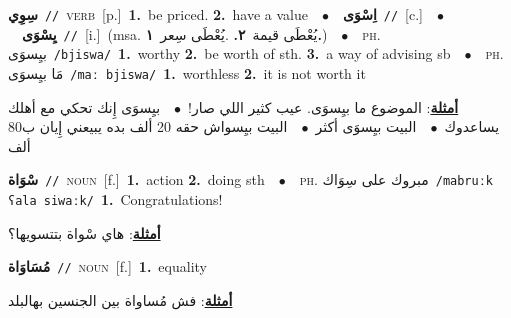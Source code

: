 \documentclass[10pt,a4paper,twoside]{article} %
\begin{document}
\begin{multicols}{2}
{\setlength\topsep{0pt}\textbf{\foreignlanguage{arabic}{سِوِي}}\ {\color{gray}\texttt{//}\color{black}}\ \textsc{verb}\ [p.]\ \textbf{1.}~be priced.  \textbf{2.}~have a value\ \ $\bullet$\ \ \setlength\topsep{0pt}\textbf{\foreignlanguage{arabic}{اِسْوَى}}\ {\color{gray}\texttt{//}\color{black}}\ [c.]\ \ $\bullet$\ \ \setlength\topsep{0pt}\textbf{\foreignlanguage{arabic}{يِسْوَى}}\ {\color{gray}\texttt{//}\color{black}}\ [i.]\ \color{gray}(msa. \foreignlanguage{arabic}{يُعْطَى قيمة}~\foreignlanguage{arabic}{\textbf{٢.}}  .\foreignlanguage{arabic}{يُعْطَى سِعر}~\foreignlanguage{arabic}{\textbf{١.}})\color{black}\ \ $\bullet$\ \ \textsc{ph.} \color{gray} \foreignlanguage{arabic}{بيِسوَى}\color{black}\ {\color{gray}\texttt{/{\sffamily bjiswa}/}\color{black}}\ \textbf{1.}~worthy  \textbf{2.}~be worth of sth.  \textbf{3.}~a way of advising sb\ \ $\bullet$\ \ \textsc{ph.} \color{gray} \foreignlanguage{arabic}{مَا بيِسوَى}\color{black}\ {\color{gray}\texttt{/{\sffamily maː bjiswa}/}\color{black}}\ \textbf{1.}~worthless  \textbf{2.}~it is not worth it\  \begin{flushright}\color{gray}\foreignlanguage{arabic}{\textbf{\underline{\foreignlanguage{arabic}{أمثلة}}}: الموضوع ما بيِسوَى. عيب كثير اللي صار!\ $\bullet$\ \  بيِسوَى إِنك تحكي مع أهلك يساعدوك\ $\bullet$\ \  البيت بيِسوَى أكثر\ $\bullet$\ \  البيت بيِسواش حقه 20 ألف بده يبيعني إِيان ب80 ألف}\end{flushright}\color{black}} \vspace{2mm}

{\setlength\topsep{0pt}\textbf{\foreignlanguage{arabic}{سْوَاة}}\ {\color{gray}\texttt{//}\color{black}}\ \textsc{noun}\ [f.]\ \textbf{1.}~action  \textbf{2.}~doing sth\ \ $\bullet$\ \ \textsc{ph.} \color{gray} \foreignlanguage{arabic}{مبروك على سِوَاك}\color{black}\ {\color{gray}\texttt{/{\sffamily mabruːk ʕala siwaːk}/}\color{black}}\ \textbf{1.}~Congratulations!\  \begin{flushright}\color{gray}\foreignlanguage{arabic}{\textbf{\underline{\foreignlanguage{arabic}{أمثلة}}}: هاي سْواة بتتسويها؟}\end{flushright}\color{black}} \vspace{2mm}

{\setlength\topsep{0pt}\textbf{\foreignlanguage{arabic}{مُسَاوَاة}}\ {\color{gray}\texttt{//}\color{black}}\ \textsc{noun}\ [f.]\ \textbf{1.}~equality\  \begin{flushright}\color{gray}\foreignlanguage{arabic}{\textbf{\underline{\foreignlanguage{arabic}{أمثلة}}}: فش مُساواة بين الجنسين بهالبلد}\end{flushright}\color{black}} \vspace{2mm}


\end{multicols}
\end{document}
